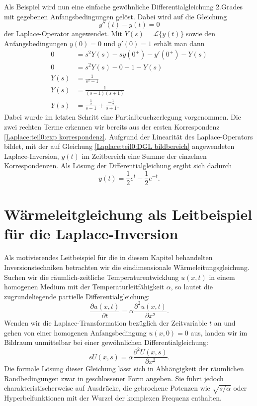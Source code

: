 Als Beispiel wird nun eine einfache gewöhnliche  Differentialgleichung 
2.Grades mit gegebenen Anfangsbedingungen gelöst.
Dabei wird auf die Gleichung
\begin{equation}
	y''(t) - y(t) = 0
\end{equation}
der Laplace-Operator angewendet. Mit $Y(s) = \mathcal{L}\{y(t)\}$ sowie den Anfangsbedingungen $y(0) = 0$ und $y'(0) = 1$ erhält man dann
\begin{equation}
	\begin{aligned}
		0 &= s^2 Y(s) - s y(0^+) - y'(0^+) - Y(s) \\
		0 &= s^2 Y(s) - 0 - 1 - Y(s)\\
		Y(s) &= \frac{1}{s^2 - 1}\\
		Y(s) &= \frac{1}{(s-1)(s+1)}\\
		Y(s) &= \frac{\tfrac{1}{2}}{s-1} + \frac{-\tfrac{1}{2}}{s+1}.
	\end{aligned}
	\label{Laplace:teil0:DGL bildbereich}
\end{equation}
Dabei wurde im letzten Schritt eine Partialbruchzerlegung vorgenommen.
Die zwei rechten Terme erkennen wir bereits aus der ersten Korrespondenz \ref{Laplace:teil0:exp korrespondenz}.
Aufgrund der Linearität des Laplace-Operators bildet, 
mit der auf Gleichung \ref{Laplace:teil0:DGL bildbereich} angewendeten Laplace-Inversion, $y(t)$ im Zeitbereich eine Summe der einzelnen Korrespondenzen. Als Lösung der Differentialgleichung ergibt sich dadurch 
\begin{equation}
	 y(t) = \frac{1}{2} e^{t} - \frac{1}{2} e^{-t}.
\end{equation}

\section{Wärmeleitgleichung als Leitbeispiel für die Laplace-Inversion}
Als motivierendes Leitbeispiel für die in diesem Kapitel behandelten Inversionstechniken betrachten wir die eindimensionale Wärmeleitungsgleichung. Suchen wir die räumlich-zeitliche Temperaturentwicklung $u(x,t)$ in einem homogenen Medium mit der Temperaturleitfähigkeit $\alpha$, so lautet die zugrundeliegende partielle Differentialgleichung:
\begin{equation}
    \frac{\partial u(x,t)}{\partial t} = \alpha \frac{\partial^2 u(x,t)}{\partial x^2}.
\end{equation}
Wenden wir die Laplace-Transformation bezüglich der Zeitvariable $t$ an und gehen von einer homogenen Anfangsbedingung $u(x,0) = 0$ aus, landen wir im Bildraum unmittelbar bei einer gewöhnlichen Differentialgleichung:
\begin{equation}
    s U(x,s) = \alpha \frac{\partial^2 U(x,s)}{\partial x^2}.
\end{equation}
Die formale Lösung dieser Gleichung lässt sich in Abhängigkeit der räumlichen Randbedingungen zwar in geschlossener Form angeben. Sie führt jedoch charakteristischerweise auf Ausdrücke, die gebrochene Potenzen wie $\sqrt{s/\alpha}$ oder Hyperbelfunktionen mit der Wurzel der komplexen Frequenz enthalten.

